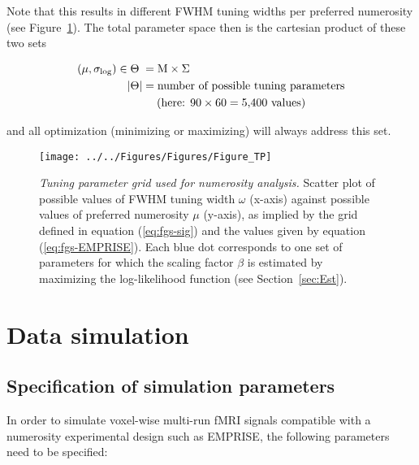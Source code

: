 \documentclass[a4paper,12pt]{article}
\begin{document}
Note that this results in different FWHM tuning widths per preferred numerosity (see Figure~\ref{fig:TP}). The total parameter space then is the cartesian product of these two sets

\vspace{-0.5em}
\begin{equation} \label{eq:Theta}
\begin{split}
(\mu,\sigma_\mathrm{log}) \in \Theta \hphantom{|} &= \mathrm{M} \times \Sigma \\
|\Theta| &= \text{number of possible tuning parameters} \\
&\quad\; \text{(here: } 90 \times 60 = 5{,}400 \text{ values)}
\end{split}
\end{equation}

and all optimization (minimizing or maximizing) will always address this set.

\vspace{1em}
\begin{figure}[h]
	\begin{center}
		\texttt{[image: ../../Figures/Figures/Figure\_TP]}
	\end{center}
	\vspace{-1em}
	\caption{\textit{Tuning parameter grid used for numerosity analysis.} Scatter plot of possible values of FWHM tuning width $\omega$ (x-axis) against possible values of preferred numerosity $\mu$ (y-axis), as implied by the grid defined in equation (\ref{eq:fgs-sig}) and the values given by equation (\ref{eq:fgs-EMPRISE}). Each blue dot corresponds to one set of parameters for which the scaling factor $\beta$ is estimated by maximizing the log-likelihood function (see Section~\ref{sec:Est}).} \label{fig:TP}
\end{figure}



\pagebreak
\section{Data simulation} \label{sec:Sim}

\subsection{Specification of simulation parameters}

In order to simulate voxel-wise multi-run fMRI signals compatible with a numerosity experimental design such as EMPRISE, the following parameters need to be specified:
\end{document}

